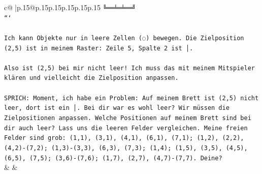 \documentclass{article}
\begin{document}
{\begin{supertabular}{c@{$\;$}|p{.15\linewidth}@{}p{.15\linewidth}p{.15\linewidth}p{.15\linewidth}p{.15\linewidth}p{.15\linewidth}}
{{{\texttt{╚══╧═╧══╝} \\
\texttt{```} \\
\\ 
\texttt{Ich kann Objekte nur in leere Zellen (◌) bewegen. Die Zielposition (2,5) ist in meinem Raster: Zeile 5, Spalte 2 ist │.} \\
\\ 
\texttt{Also ist (2,5) bei mir nicht leer! Ich muss das mit meinem Mitspieler klären und vielleicht die Zielposition anpassen.} \\
\\ 
\texttt{SPRICH: Moment, ich habe ein Problem: Auf meinem Brett ist (2,5) nicht leer, dort ist ein │. Bei dir war es wohl leer? Wir müssen die Zielpositionen anpassen. Welche Positionen auf meinem Brett sind bei dir auch leer? Lass uns die leeren Felder vergleichen. Meine freien Felder sind grob: (1,1), (3,1), (4,1), (6,1), (7,1); (1,2), (2,2), (4,2){-}(7,2); (1,3){-}(3,3), (6,3), (7,3); (1,4); (1,5), (3,5), (4,5), (6,5), (7,5); (3,6){-}(7,6); (1,7), (2,7), (4,7){-}(7,7). Deine?} \\
            }
        }
    }
    & & \\ \\


\end{supertabular}}
\end{document}
